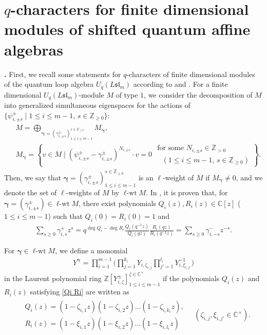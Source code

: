 \documentclass[12pt]{amsart}
\def \para{\refstepcounter{thm} \par\medskip\noindent
                \textbf{\thethm .} }
\numberwithin{equation}{thm}
\newcommand\CC{\mathbb C}
\newcommand\ZZ{\mathbb Z}
\newcommand\g{\gamma}
\newcommand\z{\zeta}
\newcommand\Bg{\boldsymbol\gamma}
\newcommand{\lwt}{\operatorname{\ell-wt}}
\newcommand\Fsl{\mathfrak{sl}}
\newcounter{ni}
\newcounter{go}
\begin{document}
\section{$q$-characters for finite dimensional modules of shifted quantum affine algebras} 

\para 
First, we recall some statements for $q$-characters of finite dimensional modules of the quantum loop algebra $U_{q}(L\Fsl_m)$ 
according to \cite{FR99} and \cite{FM01}. 
For a finite dimensional $U_q(L\Fsl_m)$-module $M$ of type $1$, 
we consider the decomposition of $M$ into generalized simultaneous eigenspaces for the actions of 
$\{\psi_{i, \pm s }^{\pm} \mid 1 \leq i \leq m-1, \, s \in \ZZ_{\geq 0}\}$:
\begin{align}
\label{decom wll-wt sp}
\begin{split}
&M = \bigoplus_{\Bg=(\g^{\pm}_{i, \pm s} )^{s \in \ZZ_{\geq 0}}_{1 \leq i \leq m-1}} M_{\Bg}, 
\\
& M_{\Bg} = \left\{ v \in M \mid (\psi_{i, \pm s}^{\pm} - \g_{i, \pm s}^{\pm})^{N_{i, \pm s}} \cdot v =0 
	 \begin{array}{l}
	 \text{ for some } 
	 N_{i, \pm s} \in \ZZ_{>0} 
	 \\  
	 \quad 
	 (1 \leq i \leq m-1, \, s \in \ZZ_{\geq 0} )
	 \end{array}
	 \right\}. 
\end{split} 
\end{align}
Then, we say that $\Bg = (\g_{i, \pm s}^{\pm})^{s \in \ZZ_{\geq 0}}_{1 \leq i \leq m-1} $ is an $\ell$-weight of $M$ if 
$M_{\Bg} \not=0$, 
and we denote the set of $\ell$-weights of $M$ by $\lwt M $. 
In \cite{FR99}, it is proven that, 
for $\Bg = (\g_{i, \pm s}^{\pm}) \in \lwt M$, 
there exist polynomials $Q_i(z) , R_i(z) \in \CC[z]$ ($1 \leq i \leq m-1$) such that $Q_i(0)=R_i(0) =1$ and 
\begin{align}
\label{Qi Ri} 
\sum_{s \geq 0} \g_{i,s}^+ z^s = q^{\deg Q_i - \deg R_i} 
	\frac{ Q_i (q^{-1} z)}{Q_i(qz)} \frac{ R_i(qz) }{R_i(q^{-1} z)} 
= \sum_{s \geq 0} \g_{i,-s}^- z^{-s}. 
\end{align}

For $\Bg \in \lwt M$, 
we define a monomial 
\begin{align*}
Y^{\Bg} = \prod_{i=1}^{m-1} \Big( \prod_{j=1}^{k_i} Y_{i, \z_{i,j}} \prod_{j'=1}^{l_i} Y_{i, \xi_{i, j'}}^{-1} \Big) 
\end{align*}
in the Laurent polynomial ring $\ZZ [Y_{i,\z}^{\pm}]^{\z \in \CC^{\times}}_{1 \leq i \leq m-1}$ 
if the polynomials $Q_i(z)$ and $R_i(z)$  satisfying \eqref{Qi Ri} are written as 
\begin{align*}
\begin{split} 
& Q_i(z) = (1 - \z_{i,1} z) (1 - \z_{i,2} z) \dots (1 -\z_{i, k_i} z), 
\\
& R_i (z) = (1 - \xi_{i,1} z) (1 - \xi_{i,2} z) \dots (1 - \xi_{i, l_i} z)
\end{split} 
\quad 
(\z_{i,j}, \xi_{i,j'} \in \CC^{\times}). 
\end{align*}
\end{document}

